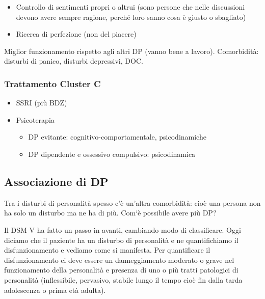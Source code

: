 \begin{itemize}
\item
  Controllo di sentimenti propri o altrui (sono persone che nelle
  discussioni devono avere sempre ragione, perché loro sanno cosa è
  giusto o sbagliato)
\item
  Ricerca di perfezione (non del piacere)
\end{itemize}

Miglior funzionamento rispetto agli altri DP (vanno bene a lavoro).
Comorbidità: disturbi di panico, disturbi depressivi, DOC.

\subsubsection{Trattamento Cluster C}

\begin{itemize}
\item
  SSRI (più BDZ)
\item
  Psicoterapia
\begin{itemize}
\item
  DP evitante: cognitivo-comportamentale, psicodinamiche
\item
  DP dipendente e ossessivo compulsivo: psicodinamica
\end{itemize}
\end{itemize}

\subsection{Associazione di DP}

Tra i disturbi di personalità spesso c'è un'altra comorbidità: cioè una
persona non ha solo un disturbo ma ne ha di più. Com`è possibile avere
più DP?

Il DSM V ha fatto un passo in avanti, cambiando modo di classificare.
Oggi diciamo che il paziente ha un disturbo di personalità e ne
quantifichiamo il disfunzionamento e vediamo come si manifesta. Per
quantificare il disfunzionamento ci deve essere un danneggiamento
moderato o grave nel funzionamento della personalità e presenza di uno o
più tratti patologici di personalità (inflessibile, pervasivo, stabile
lungo il tempo cioè fin dalla tarda adolescenza o prima età adulta).
